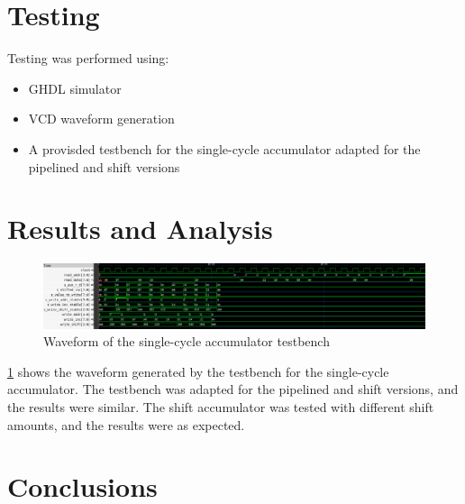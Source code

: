 \documentclass[a4paper,12pt]{article}
\begin{document}
\section{Testing}
Testing was performed using:
\begin{itemize}
    \item GHDL simulator
    \item VCD waveform generation
    \item A provisded testbench for the single-cycle accumulator adapted for the pipelined and shift versions
\end{itemize}

\section{Results and Analysis}
\begin{figure}[H]
    \centering
    \includegraphics[width=0.8\linewidth]{waveform.png}
    \caption{Waveform of the single-cycle accumulator testbench}
    \label{fig:waveform}
\end{figure}

\ref{fig:waveform} shows the waveform generated by the testbench for the single-cycle accumulator. The testbench was adapted for the pipelined and shift versions, and the results were similar. The shift accumulator was tested with different shift amounts, and the results were as expected.

\section{Conclusions}
\end{document}
